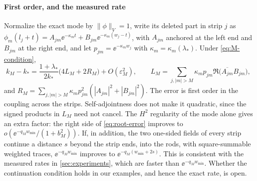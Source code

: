 \paragraph{First order, and the measured rate} Normalize the exact mode by
$\|\phi\|_V=1$, write its deleted part in strip $j$ as
$\phi_m(l_j+t)=A_{jm}\ee^{-\kappa_mt}+B_{jm}\ee^{-\kappa_m(w_j-t)}$, with $A_{jm}$
anchored at the left end and $B_{jm}$ at the right end, and let
$p_{jm}=\ee^{-\kappa_mw_j}$ with $\kappa_m=\kappa_m(\lambda_*)$. Under
\eqref{eq:M-condition},
\begin{equation}\label{eq:first-order}
  k_M-k_*=\frac{1+\lambda_*}{2k_*}\bigl(4L_M+2R_M\bigr)+O(\varepsilon_M^2),
  \qquad
  L_M=\sum_{j,|m|>M}\kappa_mp_{jm}\Re\bigl(\overline{A_{jm}}B_{jm}\bigr),
\end{equation}
and $R_M=\sum_{j,|m|>M}\kappa_mp_{jm}^2(|A_{jm}|^2+|B_{jm}|^2)$. The error is first
order in the coupling across the strips. Self-adjointness does not make it
quadratic, since the signed products in $L_M$ need not cancel. The $H^2$
regularity of the mode alone gives an extra factor: the right side of
\eqref{eq:root-error} improves to $o(\ee^{-q_Mw_{\min}}/(1+b_M^2))$. If, in
addition, the two one-sided fields of every strip continue a distance $s$
beyond the strip ends, into the rods, with square-summable weighted traces, $\ee^{-q_Mw_{\min}}$ improves to
$\ee^{-q_M(w_{\min}+2s)}$. This is consistent with the measured rates in
\cref{sec:experiments}, which are faster than $\ee^{-q_Mw_{\min}}$. Whether the
continuation condition holds in our examples, and hence the exact rate, is
open.

